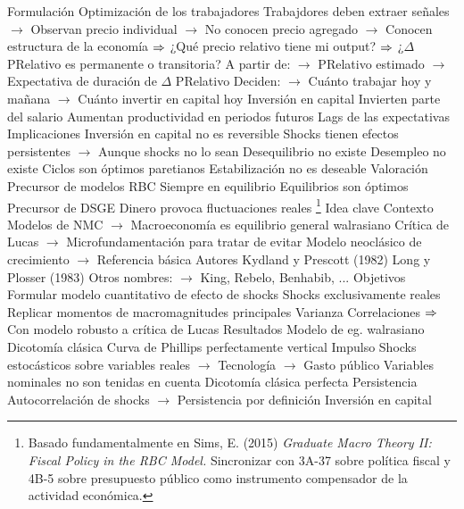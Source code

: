 \documentclass{nuevotema}
\begin{document}
\begin{esquemal}
			\3 Formulación
				\4 Optimización de los trabajadores
				\4[] Trabajdores deben extraer señales
				\4[] $\to$ Observan precio individual
				\4[] $\to$ No conocen precio agregado
				\4[] $\to$ Conocen estructura de la economía
				\4[] $\Rightarrow$ ¿Qué precio relativo tiene mi output?
				\4[] $\Rightarrow$ ¿$\Delta$ PRelativo es permanente o transitoria?
				\4[] A partir de:
				\4[] $\to$ PRelativo estimado
				\4[] $\to$ Expectativa de duración de $\Delta$ PRelativo
				\4[] Deciden:
				\4[] $\to$ Cuánto trabajar hoy y mañana
				\4[] $\to$ Cuánto invertir en capital hoy
				\4 Inversión en capital
				\4[] Invierten parte del salario
				\4[] Aumentan productividad en periodos futuros
				\4 Lags de las expectativas
			\3 Implicaciones
				\4 Inversión en capital no es reversible
				\4[] Shocks tienen efectos persistentes
				\4[] $\to$ Aunque shocks no lo sean
				\4 Desequilibrio no existe
				\4 Desempleo no existe
				\4 Ciclos son óptimos paretianos
				\4 Estabilización no es deseable
			\3 Valoración
				\4 Precursor de modelos RBC
				\4[] Siempre en equilibrio
				\4[] Equilibrios son óptimos
				\4 Precursor de DSGE
				\4[] Dinero provoca fluctuaciones reales
	\1 \footnote{Basado fundamentalmente en Sims, E. (2015) \textit{Graduate Macro Theory II: Fiscal Policy in the RBC Model.} Sincronizar con 3A-37 sobre política fiscal y 4B-5 sobre presupuesto público como instrumento compensador de la actividad económica.}
		\2 Idea clave
			\3 Contexto
				\4 Modelos de NMC
				\4[] $\to$ Macroeconomía es equilibrio general walrasiano
				\4[] Crítica de Lucas
				\4[] $\to$ Microfundamentación para tratar de evitar
				\4[] Modelo neoclásico de crecimiento
				\4[] $\to$ Referencia básica
				\4 Autores
				\4[] Kydland y Prescott (1982)
				\4[] Long y Plosser (1983)
				\4[] Otros nombres:
				\4[] $\to$  King, Rebelo, Benhabib, ...
			\3 Objetivos
				\4 Formular modelo cuantitativo de efecto de shocks
				\4 Shocks exclusivamente reales
				\4 Replicar momentos de macromagnitudes principales
				\4[] Varianza
				\4[] Correlaciones
				\4[] $\Rightarrow$ Con modelo robusto a crítica de Lucas
			\3 Resultados
				\4 Modelo de eg. walrasiano
				\4 Dicotomía clásica
				\4[] Curva de Phillips perfectamente vertical
				\4 Impulso
				\4[] Shocks estocásticos sobre variables reales
				\4[] $\to$ Tecnología
				\4[] $\to$ Gasto público
				\4[] Variables nominales no son tenidas en cuenta
				\4[] Dicotomía clásica perfecta
				\4 Persistencia
				\4[] Autocorrelación de shocks
				\4[] $\to$ Persistencia por definición
				\4[] Inversión en capital

\end{esquemal}
\end{document}
